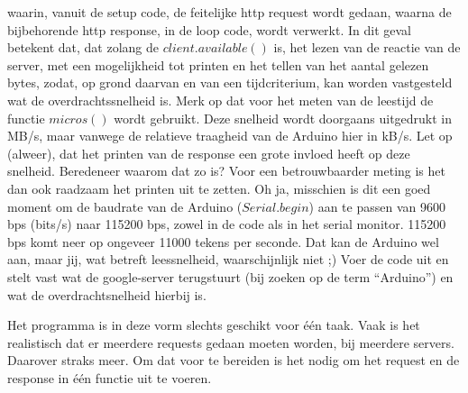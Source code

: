 waarin, vanuit de setup code, de feitelijke http request wordt gedaan, waarna de bijbehorende http response, in de loop code, wordt verwerkt. In dit geval betekent dat, dat zolang de $client.available()$ is, het lezen van de reactie van de server, met een mogelijkheid tot printen en het tellen van het aantal gelezen bytes, zodat, op grond daarvan en van een tijdcriterium, kan worden vastgesteld wat de overdrachtssnelheid is. Merk op dat voor het meten van de leestijd de functie $micros()$ wordt gebruikt. Deze snelheid wordt doorgaans uitgedrukt in MB/s, maar vanwege de relatieve traagheid van de Arduino hier in kB/s. Let op (alweer), dat het printen van de response een grote invloed heeft op deze snelheid. Beredeneer waarom dat zo is? Voor een betrouwbaarder meting is het dan ook raadzaam het printen uit te zetten.
Oh ja, misschien is dit een goed moment om de baudrate van de Arduino ($Serial.begin$) aan te passen van 9600 bps (bits/s) naar 115200 bps, zowel in de code als in het serial monitor. 115200 bps komt neer op ongeveer 11000 tekens per seconde. Dat kan de Arduino wel aan, maar jij, wat betreft leessnelheid, waarschijnlijk niet ;)
Voer de code uit en stelt vast wat de google-server terugstuurt (bij zoeken op de term “Arduino”) en wat de overdrachtsnelheid hierbij is. \newline \newline

Het programma is in deze vorm slechts geschikt voor één taak. Vaak is het realistisch dat er meerdere requests gedaan moeten worden, bij meerdere servers. Daarover straks meer. Om dat voor te bereiden is het nodig om het request en de response in één functie uit te voeren.

